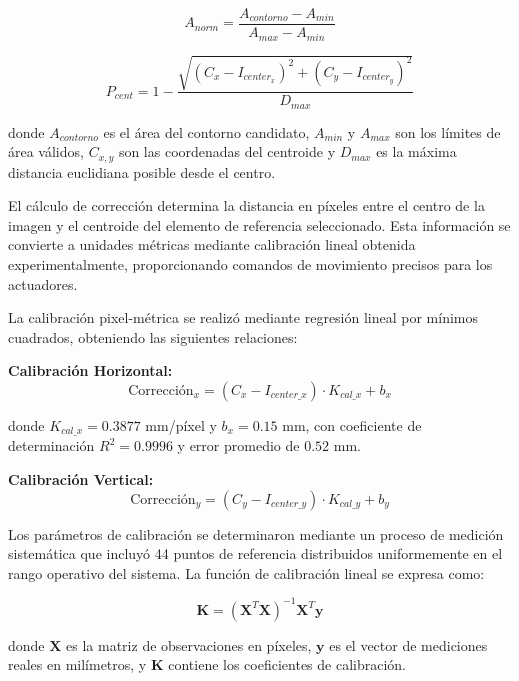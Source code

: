 \begin{equation}
A_{norm} = \frac{A_{contorno} - A_{min}}{A_{max} - A_{min}}
\end{equation}

\begin{equation}
P_{cent} = 1 - \frac{\sqrt{(C_x - I_{center_x})^2 + (C_y - I_{center_y})^2}}{D_{max}}
\end{equation}

donde $A_{contorno}$ es el área del contorno candidato, $A_{min}$ y $A_{max}$ son los límites de área válidos, $C_{x,y}$ son las coordenadas del centroide y $D_{max}$ es la máxima distancia euclidiana posible desde el centro.

El cálculo de corrección determina la distancia en píxeles entre el centro de la imagen y el centroide del elemento de referencia seleccionado. Esta información se convierte a unidades métricas mediante calibración lineal obtenida experimentalmente, proporcionando comandos de movimiento precisos para los actuadores.

La calibración pixel-métrica se realizó mediante regresión lineal por mínimos cuadrados, obteniendo las siguientes relaciones:

\textbf{Calibración Horizontal:}
\begin{equation}
\text{Corrección}_x = (C_x - I_{center\_x}) \cdot K_{cal\_x} + b_x
\end{equation}

donde $K_{cal\_x} = 0.3877$ mm/píxel y $b_x = 0.15$ mm, con coeficiente de determinación $R^2 = 0.9996$ y error promedio de $0.52$ mm.

\textbf{Calibración Vertical:}
\begin{equation}
\text{Corrección}_y = (C_y - I_{center\_y}) \cdot K_{cal\_y} + b_y
\end{equation}

Los parámetros de calibración se determinaron mediante un proceso de medición sistemática que incluyó 44 puntos de referencia distribuidos uniformemente en el rango operativo del sistema. La función de calibración lineal se expresa como:

\begin{equation}
\mathbf{K} = (\mathbf{X}^T\mathbf{X})^{-1}\mathbf{X}^T\mathbf{y}
\end{equation}

donde $\mathbf{X}$ es la matriz de observaciones en píxeles, $\mathbf{y}$ es el vector de mediciones reales en milímetros, y $\mathbf{K}$ contiene los coeficientes de calibración.

